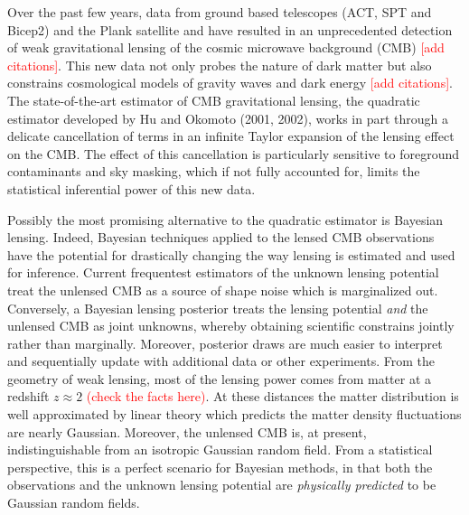\documentclass[noinfoline]{imsart}
\begin{document}
 Over the past few years, data from ground based telescopes (ACT, SPT and Bicep2) and the Plank satellite and have resulted in an unprecedented detection of weak gravitational lensing of the cosmic microwave background (CMB) \textcolor{red}{[add citations]}.  This new data not only probes the nature of dark matter but also constrains cosmological models of gravity waves and dark energy \textcolor{red}{[add citations]}. The state-of-the-art estimator of CMB gravitational lensing, the quadratic estimator developed by Hu and Okomoto (2001, 2002), works in part through a delicate cancellation of terms in an infinite Taylor expansion of the lensing effect on the CMB. The effect of this cancellation is particularly sensitive to foreground contaminants and sky masking, which  if not fully accounted for,  limits  the statistical inferential power of this new data.  

 Possibly the most promising alternative to the quadratic estimator is Bayesian lensing. Indeed, Bayesian techniques applied to the lensed CMB observations have the potential for drastically changing the way lensing is estimated and used for inference.  Current frequentest estimators of the unknown lensing potential treat the unlensed CMB as a source of shape noise which is marginalized out. Conversely, a Bayesian lensing posterior treats the lensing potential {\em and} the unlensed CMB as joint unknowns, whereby obtaining scientific constrains jointly rather than marginally. Moreover,  posterior draws are much easier to interpret and sequentially update with additional data or other experiments. From the geometry of weak lensing, most of the lensing power comes from matter at a redshift $z\approx 2$ \textcolor{red}{(check the facts here)}. At these distances the matter distribution is well approximated by linear theory which predicts the matter density fluctuations are nearly Gaussian. Moreover, the unlensed CMB is, at present, indistinguishable from an isotropic Gaussian random field.  From a statistical perspective, this is a perfect scenario for Bayesian methods, in that both the observations and the unknown lensing potential are {\em physically predicted} to be Gaussian random fields.  
 
\end{document}
